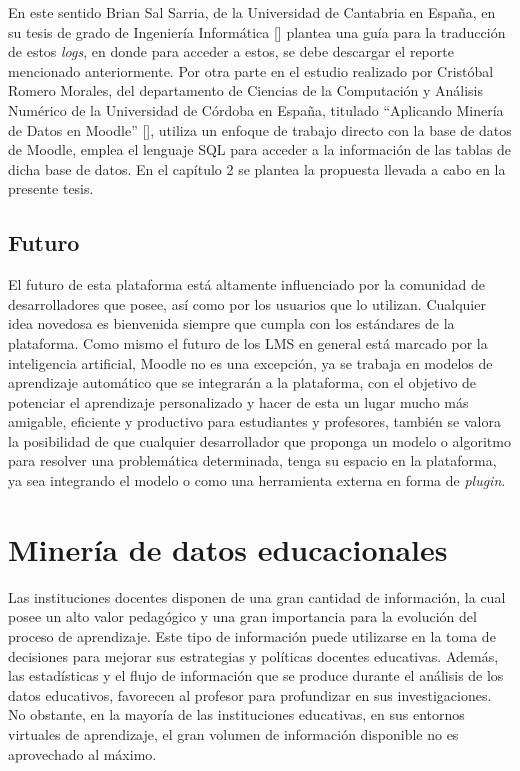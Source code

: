 En este sentido Brian Sal Sarria, de la Universidad de Cantabria en España, en su tesis de grado de Ingeniería Informática [\cite{Sarria_tesis}] plantea una guía para la traducción de estos \textit{logs}, en donde para acceder a estos, se debe descargar el reporte mencionado anteriormente. Por otra parte en el estudio realizado por Cristóbal Romero Morales, del departamento de Ciencias de la Computación y Análisis Numérico de la Universidad de Córdoba en España, titulado  ``Aplicando Minería de Datos en Moodle'' [\cite{Romero_tesis}], utiliza un enfoque de trabajo directo con la base de datos de Moodle, emplea el lenguaje SQL para acceder a la información de las tablas de dicha base de datos. En el capítulo 2 se plantea la propuesta llevada a cabo en la presente tesis.  


\subsection{Futuro}
El futuro de esta plataforma está altamente influenciado por la comunidad de desarrolladores que posee, así como por los usuarios que lo utilizan. Cualquier idea novedosa es bienvenida siempre que cumpla con los estándares de la plataforma. Como mismo el futuro de los LMS en general está marcado por la inteligencia artificial, Moodle no es una excepción, ya se trabaja en modelos de aprendizaje automático que se integrarán a la plataforma, con el objetivo de potenciar el aprendizaje personalizado y hacer de esta un lugar mucho más amigable, eficiente y productivo para estudiantes y profesores, también se valora la posibilidad de que cualquier desarrollador que proponga un modelo o algoritmo para resolver una problemática determinada, tenga su espacio en la plataforma, ya sea integrando el modelo o como una herramienta externa en forma de \textit{plugin}.  


\section{Minería de datos educacionales}

Las instituciones docentes disponen de una gran cantidad de información, la cual posee un alto valor pedagógico y una gran importancia para la evolución del proceso de aprendizaje. Este tipo de información puede utilizarse en la toma de decisiones para mejorar sus estrategias y políticas docentes educativas. Además, las estadísticas y el flujo de información que se produce durante el análisis de los datos educativos, favorecen al profesor para profundizar en sus investigaciones. No obstante, en la mayoría de las instituciones educativas, en sus entornos virtuales de aprendizaje, el gran volumen de información disponible no es aprovechado al máximo.  


